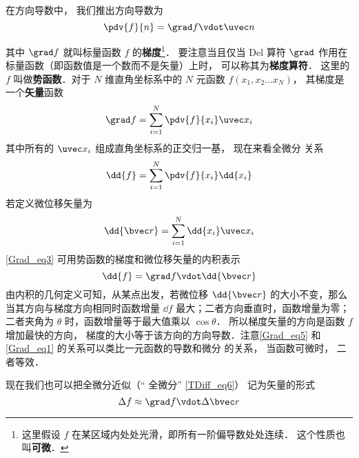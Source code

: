

在方向导数中， 我们推出方向导数为
\begin{equation}\label{Grad_eq1}
\pdv{f}{n} = \grad f \vdot \uvec n
\end{equation}
 
其中 $\grad f$ 就叫标量函数 $f$ 的\textbf{梯度}\footnote{这里假设 $f$ 在某区域内处处光滑，即所有一阶偏导数处处连续． 这个性质也叫\textbf{可微}．}． 要注意当且仅当 Del 算符 $\grad$ 作用在标量函数（即函数值是一个数而不是矢量）上时， 可以称其为\textbf{梯度算符}． 这里的 $f$ 叫做\textbf{势函数}．对于 $N$ 维直角坐标系中的 $N$ 元函数 $f(x_1,x_2\dots x_N)$， 其梯度是一个\textbf{矢量}函数
\begin{equation}
\grad f = \sum_{i=1}^{N}\pdv{f}{x_i}\uvec x_i
\end{equation}
其中所有的 $\uvec x_i$ 组成直角坐标系的正交归一基， 现在来看全微分 关系
\begin{equation}\label{Grad_eq3}
\dd{f} = \sum_{i = 1}^N \pdv{f}{x_i} \dd{x_i}
\end{equation}
若定义微位移矢量为
\begin{equation}
\dd{\bvec r} = \sum_{i=1}^{N} \dd{x_i} \uvec x_i
\end{equation}
\autoref{Grad_eq3} 可用势函数的梯度和微位移矢量的内积表示
\begin{equation}\label{Grad_eq5}
\dd{f} = \grad f \vdot \dd{\bvec r}
\end{equation}
由内积的几何定义可知，从某点出发，若微位移 $\dd{\bvec r}$ 的大小不变，那么当其方向与梯度方向相同时函数增量 $\dd{f}$ 最大；二者方向垂直时，函数增量为零；二者夹角为 $\theta$ 时，函数增量等于最大值乘以 $\cos \theta$． 所以梯度矢量的方向是函数 $f$ 增加最快的方向， 梯度的大小等于该方向的方向导数．注意\autoref{Grad_eq5} 和\autoref{Grad_eq1} 的关系可以类比一元函数的导数和微分 的关系， 当函数可微时， 二者等效．

现在我们也可以把全微分近似（“ 全微分” \autoref{TDiff_eq6}） 记为矢量的形式
\begin{equation}\label{Grad_eq6}
\Delta f \approx \grad f \vdot \Delta \bvec r
\end{equation}

